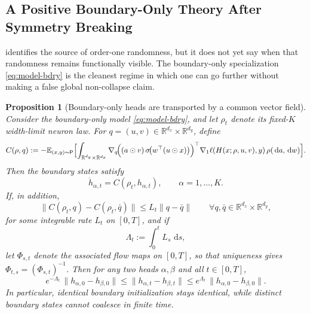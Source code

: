 \documentclass[11pt]{article}
\newtheorem{proposition}[theorem]{Proposition}
\theoremstyle{definition}
\newcommand{\R}{\mathbb{R}}
\newcommand{\E}{\mathbb{E}}
\newcommand{\dd}{\,\mathrm{d}}
\begin{document}
\subsection{A Positive Boundary-Only Theory After Symmetry Breaking}
\label{sec:boundary-positive}

 identifies the source of order-one randomness, but it
does not yet say when that randomness remains functionally visible. The
boundary-only specialization \eqref{eq:model-bdry} is the cleanest regime in
which one can go further without making a false global non-collapse claim.

\begin{proposition}[Boundary-only heads are transported by a common vector field]
\label{prop:boundary-flow}
Consider the boundary-only model \eqref{eq:model-bdry}, and let $\rho_t$ denote
its fixed-$K$ width-limit neuron law. For
\(
  q=(u,v)\in\R^{d_x}\times\R^{d_y}
\),
define
\begin{equation}
  C(\rho,q)
  :=
  -\E_{(x,y)\sim\mathsf P}
  \Bigl[
    \int_{\R^{d_y}\times\R^{d_x}}
    \nabla_q\!\Bigl(
      (a\odot v)\,\sigma\!\bigl(w^\top(u\odot x)\bigr)
    \Bigr)^\top
    \nabla_1\ell(H(x;\rho,u,v),y)\,\rho(\dd a,\dd w)
  \Bigr].
  \label{eq:boundary-drift}
\end{equation}
Then the boundary states satisfy
\[
  \dot h_{\alpha,t}=C(\rho_t,h_{\alpha,t}),
  \qquad
  \alpha=1,\dots,K.
\]
If, in addition,
\[
  \|C(\rho_t,q)-C(\rho_t,\bar q)\|
  \le
  L_t\|q-\bar q\|
  \qquad
  \forall q,\bar q\in\R^{d_x}\times\R^{d_y},
\]
for some integrable rate $L_t$ on $[0,T]$, and if
\[
  \Lambda_t:=\int_0^t L_s\,\dd s,
\]
let $\Phi_{s,t}$ denote the associated flow maps on $[0,T]$, so that
uniqueness gives $\Phi_{t,s}=(\Phi_{s,t})^{-1}$. Then for any two heads
$\alpha,\beta$ and all $t\in[0,T]$,
\begin{equation}
  e^{-\Lambda_t}\,
  \|h_{\alpha,0}-h_{\beta,0}\|
  \le
  \|h_{\alpha,t}-h_{\beta,t}\|
  \le
  e^{\Lambda_t}\,
  \|h_{\alpha,0}-h_{\beta,0}\|.
  \label{eq:boundary-bilipschitz}
\end{equation}
In particular, identical boundary initialization stays identical, while
distinct boundary states cannot coalesce in finite time.
\end{proposition}
\end{document}
